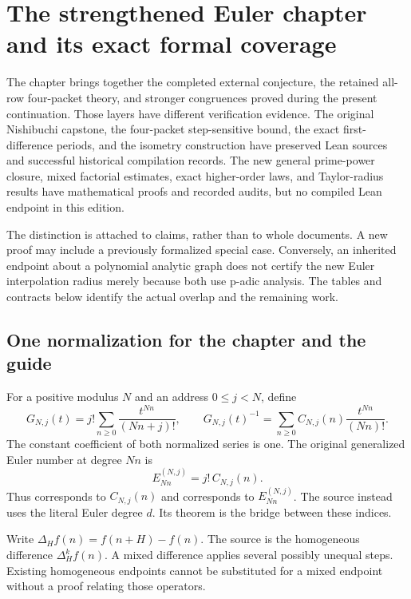 \section{The strengthened Euler chapter and its exact formal coverage}\label{sec:new-coverage}

The chapter brings together the completed external conjecture, the retained all-row four-packet theory, and stronger congruences proved during the present continuation. Those layers have different verification evidence. The original Nishibuchi capstone, the four-packet step-sensitive bound, the exact first-difference periods, and the isometry construction have preserved Lean sources and successful historical compilation records. The new general prime-power closure, mixed factorial estimates, exact higher-order laws, and Taylor-radius results have mathematical proofs and recorded audits, but no compiled Lean endpoint in this edition.

The distinction is attached to claims, rather than to whole documents. A new proof may include a previously formalized special case. Conversely, an inherited endpoint about a polynomial analytic graph does not certify the new Euler interpolation radius merely because both use p-adic analysis. The tables and contracts below identify the actual overlap and the remaining work.

\subsection{One normalization for the chapter and the guide}
For a positive modulus $N$ and an address $0\le j<N$, define
\[
 G_{N,j}(t)=j!\sum_{n\ge0}\frac{t^{Nn}}{(Nn+j)!},\qquad
 G_{N,j}(t)^{-1}=\sum_{n\ge0}C_{N,j}(n)\frac{t^{Nn}}{(Nn)!}.
\]
The constant coefficient of both normalized series is one. The original generalized Euler number at degree $Nn$ is
\[
 E_{Nn}^{(N,j)}=j!\,C_{N,j}(n).
\]
Thus  corresponds to $C_{N,j}(n)$ and  corresponds to $E_{Nn}^{(N,j)}$. The source  instead uses the literal Euler degree $d$. Its theorem  is the bridge between these indices.

Write $\Delta_H f(n)=f(n+H)-f(n)$. The source  is the homogeneous difference $\Delta_H^k f(n)$. A mixed difference applies several possibly unequal steps. Existing homogeneous endpoints cannot be substituted for a mixed endpoint without a proof relating those operators.

